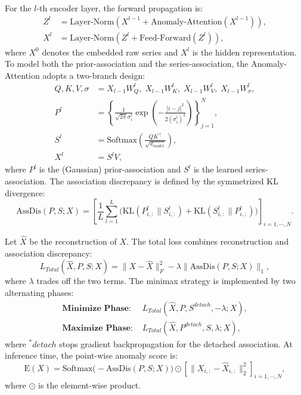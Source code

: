 \documentclass[pdflatex,sn-mathphys-num]{sn-jnl}%
\theoremstyle{thmstyleone}
\theoremstyle{thmstyletwo}%
\theoremstyle{thmstylethree}%
\begin{document}
For the $l$-th encoder layer, the forward propagation is:
\begin{equation}
\begin{aligned}
Z^{l} &= \mathrm{Layer\text{-}Norm}\!\left(X^{l-1}+\mathrm{Anomaly\text{-}Attention}\!\left(X^{l-1}\right)\right),\\
X^{l} &= \mathrm{Layer\text{-}Norm}\!\left(Z^{l}+\mathrm{Feed\text{-}Forward}\!\left(Z^{l}\right)\right),
\end{aligned}
\end{equation}
where $X^{0}$ denotes the embedded raw series and $X^{l}$ is the hidden representation.
To model both the prior-association and the series-association, the Anomaly-Attention adopts a two-branch design:
\begin{equation}
\begin{aligned}
Q,K,V,\sigma &= X_{l-1}W_{Q}^{l},\;X_{l-1}W_{K}^{l},\;X_{l-1}W_{V}^{l},\;X_{l-1}W_{\sigma}^{l},\\
P^{l} &= \left\{\frac{1}{\sqrt{2\pi}\sigma_{i}^{l}}
\exp\!\left(-\frac{|i-j|^{2}}{2(\sigma_{i}^{l})^{2}}\right)\right\}_{j=1}^{N},\\
S^{l} &= \mathrm{Softmax}\!\left(\frac{QK^{\top}}{\sqrt{d_{model}}}\right),\\
X^{l} &= S^{l}V,
\end{aligned}
\end{equation}
where $P^{l}$ is the (Gaussian) prior-association and $S^{l}$ is the learned series-association.
The association discrepancy is defined by the symmetrized KL divergence:
\begin{equation}
\mathrm{AssDis}(P,S;X)=
\left[
\frac{1}{L}\sum_{l=1}^{L}\Big(\mathrm{KL}(P^{l}_{i,:}\|S^{l}_{i,:})+\mathrm{KL}(S^{l}_{i,:}\|P^{l}_{i,:})\Big)
\right]_{i=1,\cdots,N}.
\end{equation}

Let $\hat{X}$ be the reconstruction of $X$. The total loss combines reconstruction and association discrepancy:
\begin{equation}
L_{Total}(\hat{X},P,S;X)=\|X-\hat{X}\|_{F}^{2}-\lambda\|\mathrm{AssDis}(P,S;X)\|_{1},
\end{equation}
where $\lambda$ trades off the two terms. The minimax strategy is implemented by two alternating phases:
\begin{equation}
\begin{aligned}
\textbf{Minimize Phase: } & L_{Total}(\hat{X},P,S^{detach},-\lambda;X),\\
\textbf{Maximize Phase: } & L_{Total}(\hat{X},P^{detach},S,\lambda;X),
\end{aligned}
\end{equation}
where $^\ast detach$ stops gradient backpropagation for the detached association. At inference time, the point-wise anomaly score is:
\begin{equation}
\mathrm{E}(X)=
\mathrm{Softmax}\!\big(-\mathrm{AssDis}(P,S;X)\big)
\odot
\left[\|X_{i,:}-\hat{X}_{i,:}\|_{2}^{2}\right]_{i=1,\cdots,N},
\end{equation}
where $\odot$ is the element-wise product.
\end{document}

